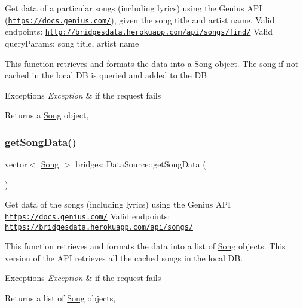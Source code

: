 Get data of a particular songs (including lyrics) using the Genius A\+PI (\href{https://docs.genius.com/}{\tt https\+://docs.\+genius.\+com/}), given the song title and artist name. Valid endpoints\+: \href{http://bridgesdata.herokuapp.com/api/songs/find/}{\tt http\+://bridgesdata.\+herokuapp.\+com/api/songs/find/} Valid query\+Params\+: song title, artist name

This function retrieves and formats the data into a \mbox{\hyperlink{classbridges_1_1_song}{Song}} object. The song if not cached in the local DB is queried and added to the DB


\begin{DoxyExceptions}{Exceptions}
{\em Exception} & if the request fails\\
\hline
\end{DoxyExceptions}
\begin{DoxyReturn}{Returns}
a \mbox{\hyperlink{classbridges_1_1_song}{Song}} object, 
\end{DoxyReturn}
\mbox{\label{namespacebridges_1_1_data_source_a325b6f25041e833bc2fd561bd2c2ee6e}} 
\subsubsection{\texorpdfstring{get\+Song\+Data()}{getSongData()}}
{\footnotesize\ttfamily vector$<$ \mbox{\hyperlink{classbridges_1_1_song}{Song}} $>$ bridges\+::\+Data\+Source\+::get\+Song\+Data (\begin{DoxyParamCaption}{ }\end{DoxyParamCaption})}

Get data of the songs (including lyrics) using the Genius A\+PI \href{https://docs.genius.com/}{\tt https\+://docs.\+genius.\+com/} Valid endpoints\+: \href{https://bridgesdata.herokuapp.com/api/songs/}{\tt https\+://bridgesdata.\+herokuapp.\+com/api/songs/}

This function retrieves and formats the data into a list of \mbox{\hyperlink{classbridges_1_1_song}{Song}} objects. This version of the A\+PI retrieves all the cached songs in the local DB.


\begin{DoxyExceptions}{Exceptions}
{\em Exception} & if the request fails\\
\hline
\end{DoxyExceptions}
\begin{DoxyReturn}{Returns}
a list of \mbox{\hyperlink{classbridges_1_1_song}{Song}} objects, 
\end{DoxyReturn}
